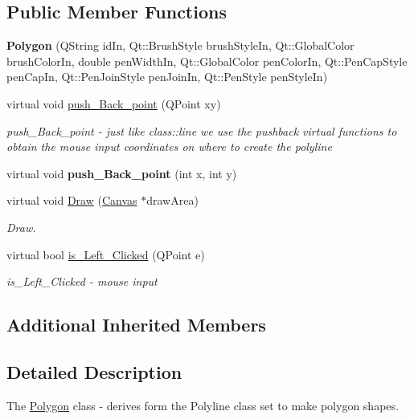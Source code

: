 \subsection*{Public Member Functions}
\begin{DoxyCompactItemize}
\item 
\mbox{\label{class_polygon_a500d5ae5db7a63abe140f6f050f5d626}} 
{\bfseries Polygon} (Q\+String id\+In, Qt\+::\+Brush\+Style brush\+Style\+In, Qt\+::\+Global\+Color brush\+Color\+In, double pen\+Width\+In, Qt\+::\+Global\+Color pen\+Color\+In, Qt\+::\+Pen\+Cap\+Style pen\+Cap\+In, Qt\+::\+Pen\+Join\+Style pen\+Join\+In, Qt\+::\+Pen\+Style pen\+Style\+In)
\item 
virtual void \hyperlink{class_polygon_ad57f4b375c6858bfe34c095bfeb38d5a}{push\+\_\+\+Back\+\_\+point} (Q\+Point xy)
\begin{DoxyCompactList}\small\item\em push\+\_\+\+Back\+\_\+point -\/ just like class\+::line we use the pushback virtual functions to obtain the mouse input coordinates on where to create the polyline \end{DoxyCompactList}\item 
\mbox{\label{class_polygon_ac61aa8a55c4f57c8242af92e0f65aa0a}} 
virtual void {\bfseries push\+\_\+\+Back\+\_\+point} (int x, int y)
\item 
virtual void \hyperlink{class_polygon_a9271921d96331c203efcdb50e0ebd64c}{Draw} (\hyperlink{class_canvas}{Canvas} $\ast$draw\+Area)
\begin{DoxyCompactList}\small\item\em Draw. \end{DoxyCompactList}\item 
virtual bool \hyperlink{class_polygon_ab17f2f8ae9489fba4030fbb4a99e7ea6}{is\+\_\+\+Left\+\_\+\+Clicked} (Q\+Point e)
\begin{DoxyCompactList}\small\item\em is\+\_\+\+Left\+\_\+\+Clicked -\/ mouse input \end{DoxyCompactList}\end{DoxyCompactItemize}
\subsection*{Additional Inherited Members}


\subsection{Detailed Description}
The \hyperlink{class_polygon}{Polygon} class -\/ derives form the Polyline class set to make polygon shapes. 

